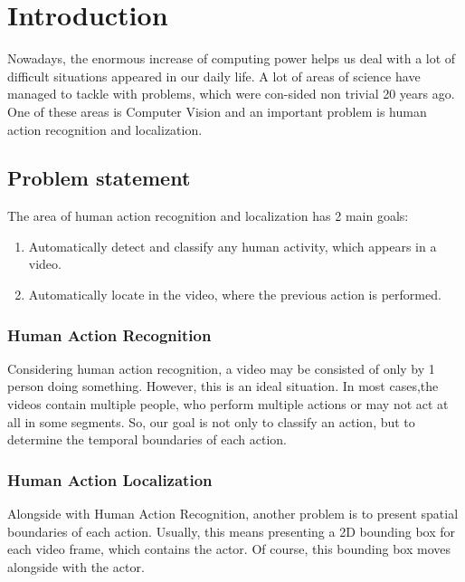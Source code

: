 



% 
\en
\chapter{Introduction}
Nowadays, the enormous increase of computing power helps us deal with a lot of difficult situations appeared in our daily life.
A lot of areas of science have managed to tackle with problems, which were con-sided non trivial 20 years ago. One of
these areas is Computer Vision and an important problem is human action recognition and localization.
\section{Problem statement}
The area of human action recognition and localization has 2 main goals:
\begin{enumerate}
\item Automatically detect and classify any human activity, which appears in a video.
\item Automatically locate in the video, where the previous action is performed.
\end{enumerate}

\subsection{Human Action Recognition}
Considering human action recognition, a video may be consisted of only by 1 person doing something. However, this is an ideal
situation. In most cases,the videos contain multiple people, who perform multiple actions or may not act at all in some segments.
So, our goal is not only to classify an action, but to determine the temporal boundaries of each action.
\subsection{Human Action Localization}
Alongside with Human Action Recognition, another problem is to present spatial boundaries of each action. Usually, this means
presenting a 2D bounding box for each video frame, which contains the actor. Of course, this bounding box moves alongside with
the actor.


